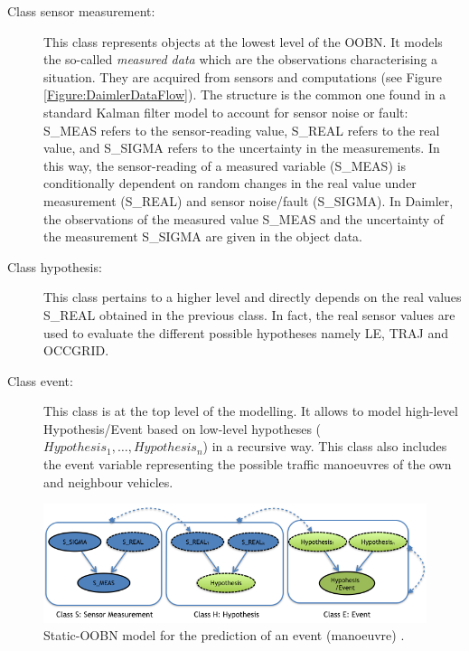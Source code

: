 \begin{description}
\item[Class sensor measurement:]  This class represents objects at the lowest level of the OOBN. It models the so-called \textit{measured data} which are  the observations characterising a situation. They are acquired from sensors and computations (see Figure \ref{Figure:DaimlerDataFlow}). The structure is the common one found in a standard Kalman filter model to account for sensor noise or fault: S\_MEAS refers to the sensor-reading value, S\_REAL refers to the real value, and S\_SIGMA refers to the uncertainty in the measurements. In this way, the sensor-reading of a measured variable (S\_MEAS) is conditionally dependent on random changes in the real value under measurement (S\_REAL) and sensor noise/fault (S\_SIGMA). In Daimler, the observations of the measured value S\_MEAS and the uncertainty of the measurement S\_SIGMA are given in the object data. 

\item[Class hypothesis:] This class pertains to a higher level and directly depends on the real values S\_REAL obtained in the previous class. In fact, the real sensor values are used to evaluate the different possible hypotheses namely LE, TRAJ and OCCGRID. 

\item[Class event:] This class is at the top level of the modelling. It allows to model high-level Hypothesis/Event based on low-level hypotheses ($Hypothesis_1, \ldots, Hypothesis_n$) in a recursive way. This class also includes the event variable representing the possible traffic manoeuvres of the own and neighbour vehicles. 
\end{description}

\begin{figure}
\begin{center}
\includegraphics[scale=0.58]{./figures/DaimlerOOBNAbstraction}
\caption{\label{Figure:DaimlerOOBNAbstraction} Static-OOBN model for the prediction of an event (manoeuvre) \cite{Weidl2014}.}
\end{center}
\end{figure}

